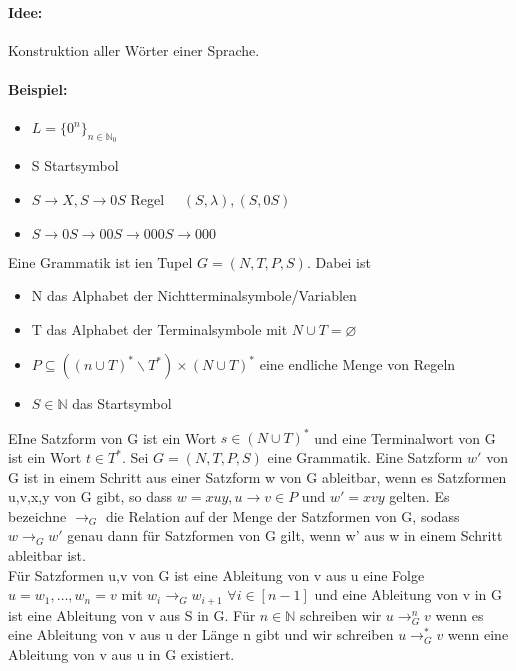 \paragraph*{Idee:} Konstruktion aller Wörter einer Sprache.
\paragraph*{Beispiel:} 
\begin{itemize}
    \item \(L=\{0^n\}_{n\in\mathbb{N}_0}\)
    \item S Startsymbol
    \item \(S\to X,S\to 0S\) Regel \( \quad (S, \lambda), (S, 0S)\)
    \item \(S\to 0S\to 00S\to 000S\to 000\)


\end{itemize}
    Eine Grammatik ist ien Tupel \(G=(N,T,P,S)\). Dabei ist 
    \begin{itemize}
        \item N das Alphabet der Nichtterminalsymbole/Variablen 
        \item T das Alphabet der Terminalsymbole mit \(N\cup T=\varnothing \)
        \item \(P\subseteq((n\cup T)^*\backslash T^*)\times (N\cup T)^*\) eine endliche Menge von Regeln
        \item \(S\in\mathbb{N}\) das Startsymbol
    \end{itemize}
    EIne Satzform von G ist ein Wort \(s\in(N\cup T)^*\) und eine Terminalwort von G ist ein Wort \(t\in T^*\).
    Sei \(G=(N,T,P,S)\) eine Grammatik. Eine Satzform \(w'\) von G ist in einem Schritt aus einer Satzform w von G ableitbar, wenn es Satzformen u,v,x,y von G gibt, so dass \(w=xuy,u\to v\in P\) und \(w'=xvy\) gelten. Es bezeichne \(\to_G\) die Relation auf der Menge der Satzformen von G, sodass \(w\to_Gw'\) genau dann für Satzformen von G gilt, wenn w' aus w in einem Schritt ableitbar ist.\\
    Für Satzformen u,v von G ist eine Ableitung von v aus u eine Folge \(u=w_1,\dots,w_n=v\) mit \(w_i\to_Gw_{i+1}\) \(\forall i\in[n-1]\) und eine Ableitung von v in G ist eine Ableitung von v aus S in G. Für \(n\in\mathbb{N}\) schreiben wir \(u\to^n_Gv\) wenn es eine Ableitung von v aus u der Länge n gibt und wir schreiben \(u\to^*_Gv\) wenn eine Ableitung von v aus u in G existiert.
